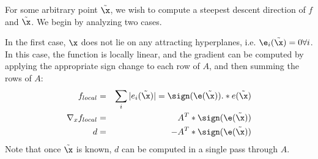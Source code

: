 For some arbitrary point $\tilde\x$, we wish to compute a steepest descent
direction of $f$ and $\tilde\x$.  We begin by analyzing two cases.

In the first case, $\x$ does not lie on any attracting hyperplanes, i.e. $\e_i(\tilde\x)=0
\forall i$. In this case, the function is locally linear, and the gradient can be computed
by applying the appropriate sign change to each row of $A$, and then summing the rows of $A$:
\begin{eqnarray}
f_{local} &=& \sum_i |e_i(\tilde\x)| = \sign(\e(\tilde\x)) .* e(\tilde\x) \\
\nabla_x f_{local} &=& A^T * \sign(\e(\tilde\x)) \\
d &=& -A^T * \sign(\e(\tilde\x))
\end{eqnarray}
Note that once $\tilde\x$ is known, $d$ can be computed in a single pass through $A$.

